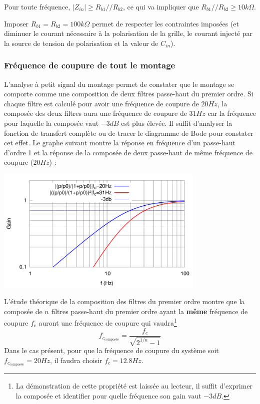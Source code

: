 \documentclass[11pt,a4paper]{article}
\theoremstyle{definition}%
\begin{document}
{Pour toute fréquence, $\left|Z_{in}\right|\geq R_{b1}//R_{b2}$, ce qui va impliquer que $R_{b1}//R_{b2}\geq 10k\Omega$.

Imposer $R_{b1}=R_{b2}=100k\Omega$ permet de respecter les contraintes imposées (et diminuer le courant nécessaire à la polarisation de la grille, le courant injecté par la source de tension de polarisation et la valeur de $C_{in}$).

\subsubsection{Fréquence de coupure de tout le montage}

L'analyse à petit signal du montage permet de constater que le montage se comporte comme une composition de deux filtres passe-haut du premier ordre. Si chaque filtre est calculé pour avoir une fréquence de coupure de $20Hz$, la composée des deux filtres aura une fréquence de coupure de $31Hz$ car la fréquence pour laquelle la composée vaut $-3dB$ est plus élevée. Il suffit d'analyser la fonction de transfert complète ou de tracer le diagramme de Bode pour constater cet effet. Le graphe suivant montre la réponse en fréquence d'un passe-haut d'ordre 1 et la réponse de la composée de deux passe-haut de même fréquence de coupure ($20Hz$) :
%
\begin{center}
\includegraphics[width=10cm]{bode_corr_20-31.pdf}
\end{center}
%
L'étude théorique de la composition des filtres du premier ordre montre que la composée de $n$ filtres passe-haut du premier ordre ayant la \textbf{même} fréquence de coupure $f_c$ auront une fréquence de coupure qui vaudra\footnote{La démonstration de cette propriété est laissée au lecteur, il suffit d'exprimer la composée et identifier pour quelle fréquence son gain vaut $-3dB$.} $$f_{c_{\mbox{composée}}}=\frac{f_c}{\sqrt{2^{1/n}-1}}$$ Dans le cas présent, pour que la fréquence de coupure du système soit $f_{c_{\mbox{composée}}}=20Hz$, il faudra choisir $f_c=12.8Hz$.

}
\end{document}
